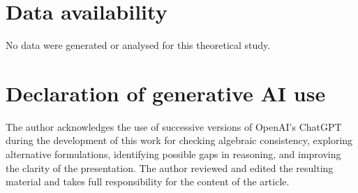 \documentclass[final,5p,times,twocolumn]{elsarticle}
\begin{document}
\section*{Data availability}
No data were generated or analysed for this theoretical study.

\section*{Declaration of generative AI use}
The author acknowledges the use of successive versions of OpenAI's ChatGPT
during the development of this work for checking algebraic consistency,
exploring alternative formulations, identifying possible gaps in reasoning,
and improving the clarity of the presentation. 
The author reviewed and edited
the resulting material and takes full responsibility for the content of the
article.




%



\end{document}
